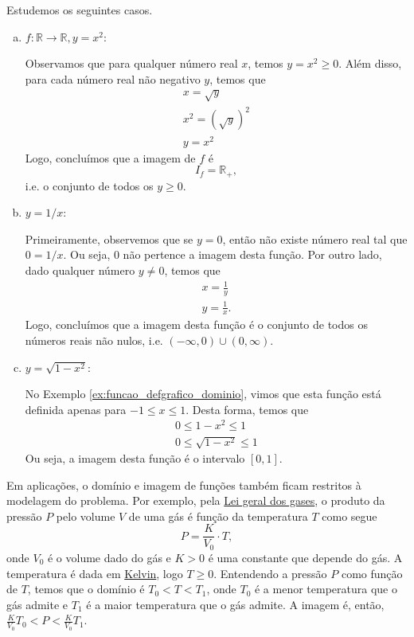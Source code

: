 \begin{ex}
  Estudemos os seguintes casos.
  \begin{enumerate}[a)]
  \item $f:\mathbb{R}\to\mathbb{R}, y=x^2$:
    
    Observamos que para qualquer número real $x$, temos $y=x^2\geq 0$. Além disso, para cada número real não negativo $y$, temos que
    \begin{gather}
      x=\sqrt{y} \\
      x^2 = \left(\sqrt{y}\right)^2\\
      y = x^2
    \end{gather}
    Logo, concluímos que a imagem de $f$ é
    \begin{equation}
      I_f = \mathbb{R}_{+},
    \end{equation}
    i.e. o conjunto de todos os $y\geq 0$.
    
  \item $y=1/x$:
    
    Primeiramente, observemos que se $y=0$, então não existe número real tal que $0=1/x$. Ou seja, $0$ não pertence a imagem desta função. Por outro lado, dado qualquer número $y\neq 0$, temos que
    \begin{gather}
      x=\frac{1}{y}\\
      y = \frac{1}{x}.
    \end{gather}
    Logo, concluímos que a imagem desta função é o conjunto de todos os números reais não nulos, i.e. $(-\infty, 0)\cup (0, \infty)$.
    
  \item $y=\sqrt{1-x^2}$:
    
    No Exemplo \ref{ex:funcao_defgrafico_dominio}, vimos que esta função está definida apenas para $-1 \leq x \leq 1$. Desta forma, temos que
    \begin{gather}
      0 \leq 1-x^2 \leq 1 \\
      0\leq \sqrt{1-x^2} \leq 1
    \end{gather}
    Ou seja, a imagem desta função é o intervalo $[0, 1]$.
  \end{enumerate}
\end{ex}

\begin{obs}
  Em aplicações, o domínio e imagem de funções também ficam restritos à modelagem do problema. Por exemplo, pela \href{https://pt.wikipedia.org/wiki/Lei\_geral\_dos\_gases}{Lei geral dos gases}, o produto da pressão $P$ pelo volume $V$ de uma gás é função da temperatura $T$ como segue
  \begin{equation}
    P = \frac{K}{V_0}\cdot T,
  \end{equation}
  onde $V_0$ é o volume dado do gás e $K>0$ é uma constante que depende do gás. A temperatura é dada em \href{https://pt.wikipedia.org/wiki/Kelvin}{Kelvin}, logo $T\geq 0$. Entendendo a pressão $P$ como função de $T$, temos que o domínio é $T_0 < T < T_1$, onde $T_0$ é a menor temperatura que o gás admite e $T_1$ é a maior temperatura que o gás admite. A imagem é, então, $\frac{K}{V_0}T_0 < P < \frac{K}{V_0}T_1$.
\end{obs}

